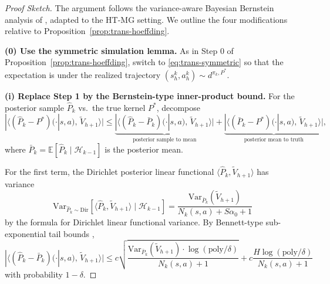 \documentclass{article}
\begin{document}
\begin{proof}[Proof Sketch]
The argument follows the variance-aware Bayesian Bernstein analysis of \citet{lu2019information}, adapted to the HT-MG setting. We outline the four modifications relative to Proposition~\ref{prop:trans-hoeffding}.

\textbf{(0) Use the symmetric simulation lemma.} As in Step 0 of Proposition~\ref{prop:trans-hoeffding}, switch to \eqref{eq:trans-symmetric} so that the expectation is under the realized trajectory $(s_h^k, a_h^k) \sim d^{\pi_k, P^*}$.

\textbf{(i) Replace Step 1 by the Bernstein-type inner-product bound.} For the posterior sample $\hat{P}_k$ vs.\ the true kernel $P^*$, decompose
\begin{equation}
|\langle (\hat{P}_k - P^*)(\cdot|s,a),\, \widetilde{V}_{h+1}\rangle| \leq \underbrace{|\langle (\hat{P}_k - \bar{P}_k)(\cdot|s,a),\, \widetilde{V}_{h+1}\rangle|}_{\text{posterior sample to mean}} + \underbrace{|\langle (\bar{P}_k - P^*)(\cdot|s,a),\, \widetilde{V}_{h+1}\rangle|}_{\text{posterior mean to truth}},
\end{equation}
where $\bar{P}_k = \mathbb{E}[\hat{P}_k \mid \mathcal{H}_{k-1}]$ is the posterior mean.

For the first term, the Dirichlet posterior linear functional $\langle \hat{P}_k, \widetilde{V}_{h+1}\rangle$ has variance
\begin{equation}
\mathrm{Var}_{\hat{P}_k \sim \mathrm{Dir}}[\langle \hat{P}_k, \widetilde{V}_{h+1}\rangle \mid \mathcal{H}_{k-1}] = \frac{\mathrm{Var}_{\bar{P}_k}(\widetilde{V}_{h+1})}{N_k(s, a) + S\alpha_0 + 1}
\end{equation}
by the formula for Dirichlet linear functional variance. By Bennett-type sub-exponential tail bounds \citep[Theorem 3]{lu2019information},
\begin{equation}
\label{eq:bayes-bernstein-1}
|\langle (\hat{P}_k - \bar{P}_k)(\cdot|s,a),\, \widetilde{V}_{h+1}\rangle| \leq c\sqrt{\frac{\mathrm{Var}_{\bar{P}_k}(\widetilde{V}_{h+1}) \cdot \log(\mathrm{poly}/\delta)}{N_k(s, a) + 1}} + c\frac{H \log(\mathrm{poly}/\delta)}{N_k(s, a) + 1}
\end{equation}
with probability $1 - \delta$.


\end{proof}
\end{document}

